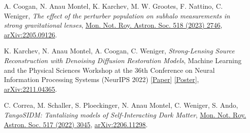 \begin{itemize}[]

{\selectfont

 \item[\cite{Coogan:2022cky}] 
A. Coogan, {N. Anau Montel}, K. Karchev,  M. W. Grootes, F. Nattino, C. Weniger, \textit{The effect of the perturber population on subhalo measurements in strong gravitational lenses}, \href{https://doi.org/10.1093/mnras/stac3215}{Mon. Not. Roy. Astron. Soc. 518 (2023) 2746}, \href{https://arxiv.org/abs/2205.09126}{\ttfamily arXiv:2205.09126}.  \vskip 4pt

\item[\cite{Karchev:2022aa}] 
K. Karchev, {N. Anau Montel}, A. Coogan, C. Weniger, \textit{Strong-Lensing Source Reconstruction with Denoising Diffusion Restoration Models}, Machine Learning and the Physical Sciences Workshop at the 36th Conference on Neural Information Processing Systems (NeurIPS 2022) \href{https://ml4physicalsciences.github.io/2022/files/NeurIPS_ML4PS_2022_169.pdf}{[Paper]} \href{https://neurips.cc/media/PosterPDFs/NeurIPS%202022/56913.png}{[Poster]}, \href{https://arxiv.org/abs/2211.04365}{\ttfamily arXiv:2211.04365}. \vskip 4pt

\item[\cite{Correa:2022aa}] 
C. Correa, M. Schaller, S. Ploeckinger, {N. Anau Montel}, C. Weniger, S. Ando, \textit{TangoSIDM: Tantalizing models of Self-Interacting Dark Matter}, \href{https://doi.org/10.1093/mnras/stac2830}{Mon. Not. Roy. Astron. Soc. 517 (2022) 3045}, \href{https://arxiv.org/abs/2206.11298}{\ttfamily arXiv:2206.11298}. \vskip 4pt



}

\end{itemize}


\newpage

